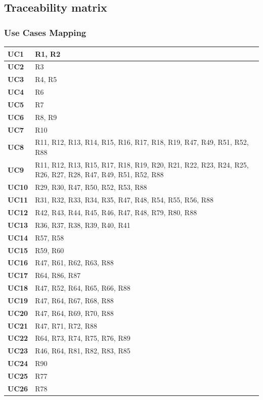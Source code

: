 \documentclass{Configuration_Files/PoliMi3i_thesis}
\begin{document}
\newpage
\subsection{Traceability matrix}

\subsubsection{Use Cases Mapping}

\begin{table}[H]
    \begin{xltabular}{\textwidth}{| >{}l|X|}
    \hline
    \textbf{UC1} & R1, R2\T\B\\
    \hline
    \textbf{UC2} & R3\T\B\\
    \hline
    \textbf{UC3} & R4, R5 \T\B\\
    \hline
    \textbf{UC4} & R6\T\B\\
    \hline
    \textbf{UC5} & R7\T\B\\
    \hline
    \textbf{UC6} & R8, R9\T\B\\
    \hline
    \textbf{UC7} & R10\T\B\\
    \hline
    \textbf{UC8} & R11, R12, R13, R14, R15, R16, R17, R18, R19, R47, R49, R51, R52, R88\T\B\\
    \hline
    \textbf{UC9} & R11, R12, R13, R15, R17, R18, R19, R20, R21, R22, R23, R24, R25, R26, R27, R28, R47, R49, R51, R52, R88\T\B\\
    \hline
    \textbf{UC10} & R29, R30, R47, R50, R52, R53, R88\T\B\\
    \hline
    \textbf{UC11} & R31, R32, R33, R34, R35, R47, R48, R54, R55, R56, R88\T\B\\
    \hline
    \textbf{UC12} & R42, R43, R44, R45, R46, R47, R48, R79, R80, R88\T\B\\
    \hline
    \textbf{UC13} & R36, R37, R38, R39, R40, R41\T\B\\
    \hline
    \textbf{UC14} & R57, R58\T\B\\
    \hline
    \textbf{UC15} & R59, R60\T\B\\
    \hline
    \textbf{UC16} & R47, R61, R62, R63, R88\T\B\\
    \hline
    \textbf{UC17} & R64, R86, R87\T\B\\
    \hline
    \textbf{UC18} & R47, R52, R64, R65, R66, R88\T\B\\
    \hline
    \textbf{UC19} & R47, R64, R67, R68, R88\T\B\\
    \hline
    \textbf{UC20} & R47, R64, R69, R70, R88\T\B\\
    \hline
    \textbf{UC21} & R47, R71, R72, R88\T\B\\
    \hline
    \textbf{UC22} & R64, R73, R74, R75, R76, R89\T\B\\
    \hline
    \textbf{UC23} & R46, R64, R81, R82, R83, R85\T\B\\
    \hline
    \textbf{UC24} & R90\T\B\\
    \hline
    \textbf{UC25} & R77\T\B\\
    \hline
    \textbf{UC26} & R78\T\B\\
    \hline
    \end{xltabular}
\end{table}
\end{document}
